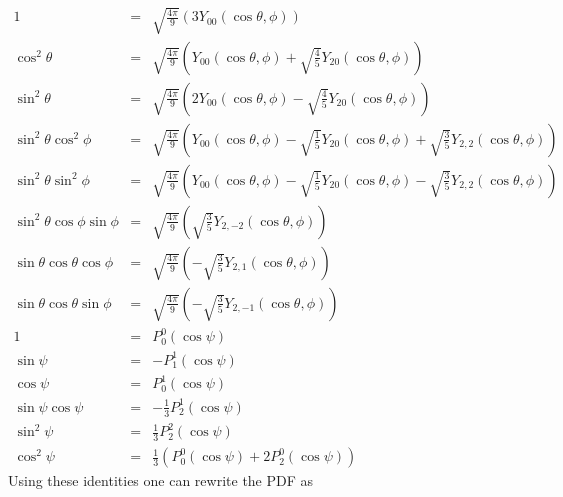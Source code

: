 \documentclass[a4paper,10pt,twosided]{article}
\begin{document}
\begin{eqnarray}
  1                       &=& \sqrt{ \frac{4\pi}{9} } \left( 3 Y_{00}(\cos\theta,\phi) \right) \\
  \cos^2\theta            &=& \sqrt{ \frac{4\pi}{9} } \left( Y_{00}(\cos\theta,\phi) + \sqrt{\frac{4}{5}}Y_{20}(\cos\theta,\phi)\right)\\
  \sin^2\theta            &=& \sqrt{ \frac{4\pi}{9} } \left( 2Y_{00}(\cos\theta,\phi) - \sqrt{\frac{4}{5}}Y_{20}(\cos\theta,\phi)\right)\\
  \sin^2\theta \cos^2\phi &=& \sqrt{ \frac{4\pi}{9} } \left( Y_{00}(\cos\theta,\phi) - \sqrt{\frac{1}{5} }Y_{20}(\cos\theta,\phi) +\sqrt{\frac{3}{5}} Y_{2,2}(\cos\theta,\phi)\right) \\
  \sin^2\theta \sin^2\phi &=& \sqrt{ \frac{4\pi}{9} } \left( Y_{00}(\cos\theta,\phi) - \sqrt{\frac{1}{5} }Y_{20}(\cos\theta,\phi) -\sqrt{\frac{3}{5}} Y_{2,2}(\cos\theta,\phi)\right) \\
  \sin^2\theta\cos\phi\sin\phi &=& \sqrt{ \frac{4\pi}{9}} \left(\sqrt{\frac{3}{5}} Y_{2,-2}(\cos\theta,\phi) \right) \\
  \sin\theta\cos\theta\cos\phi &=& \sqrt{ \frac{4\pi}{9}}\left( -\sqrt{\frac{3}{5}}Y_{2,1}(\cos\theta,\phi)\right) \\ 
  \sin\theta\cos\theta\sin\phi &=& \sqrt{ \frac{4\pi}{9}}\left( -\sqrt{\frac{3}{5}}Y_{2,-1}(\cos\theta,\phi) \right) \\
  1 & = & P_0^0(\cos\psi)\\
  \sin \psi & = & -P_1^1(\cos\psi)\\
  \cos \psi & = & P_0^1(\cos\psi)\\
  \sin\psi\cos\psi &=& -\frac{1}{3} P_2^1(\cos\psi) \\
  \sin^2 \psi      &=&  \frac{1}{3} P_2^2(\cos\psi) \\
  \cos^2 \psi      &=&  \frac{1}{3} \left( P_0^0(\cos\psi)+2P_2^0(\cos\psi) \right)
\end{eqnarray}
Using these identities one can rewrite the PDF as 
\end{document}
